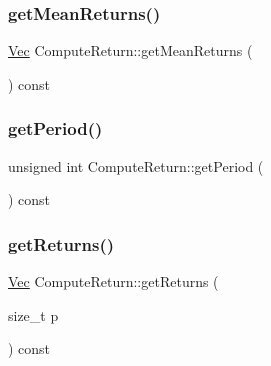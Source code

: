 \hypertarget{classComputeReturn_a4ea1191d38980ccebc6603e4f4fb7dce}{}\label{classComputeReturn_a4ea1191d38980ccebc6603e4f4fb7dce} 
\subsubsection{\texorpdfstring{get\+Mean\+Returns()}{getMeanReturns()}}
{\footnotesize\ttfamily \hyperlink{compute__returns__eigen_8h_a1eb6a9306ef406d7975f3cbf2e247777}{Vec} Compute\+Return\+::get\+Mean\+Returns (\begin{DoxyParamCaption}{ }\end{DoxyParamCaption}) const\hspace{0.3cm}{\ttfamily [inline]}}

\hypertarget{classComputeReturn_a5a47d689a1f989932511663b6ec59aa6}{}\label{classComputeReturn_a5a47d689a1f989932511663b6ec59aa6} 
\subsubsection{\texorpdfstring{get\+Period()}{getPeriod()}}
{\footnotesize\ttfamily unsigned int Compute\+Return\+::get\+Period (\begin{DoxyParamCaption}{ }\end{DoxyParamCaption}) const\hspace{0.3cm}{\ttfamily [inline]}}

\hypertarget{classComputeReturn_a9876c0984f83ab96da90e883270171bb}{}\label{classComputeReturn_a9876c0984f83ab96da90e883270171bb} 
\subsubsection{\texorpdfstring{get\+Returns()}{getReturns()}\hspace{0.1cm}{\footnotesize\ttfamily [1/2]}}
{\footnotesize\ttfamily \hyperlink{compute__returns__eigen_8h_a1eb6a9306ef406d7975f3cbf2e247777}{Vec} Compute\+Return\+::get\+Returns (\begin{DoxyParamCaption}\item[{size\+\_\+t}]{p }\end{DoxyParamCaption}) const}

